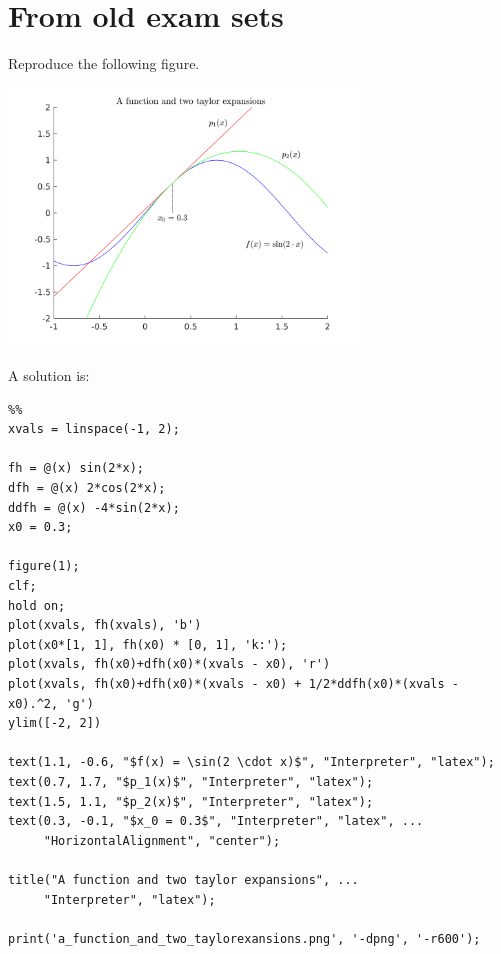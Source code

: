 \section{From old exam sets}



\begin{ex}
Reproduce the following figure.
\begin{center}
\includegraphics[width=0.7\textwidth]{pic/a_function_and_two_taylorexansions.png}
\end{center}
\begin{hint}
\end{hint}
\begin{sol}
A solution is:
\begin{lstlisting}
%%
xvals = linspace(-1, 2);

fh = @(x) sin(2*x);
dfh = @(x) 2*cos(2*x);
ddfh = @(x) -4*sin(2*x);
x0 = 0.3;

figure(1);
clf;
hold on;
plot(xvals, fh(xvals), 'b')
plot(x0*[1, 1], fh(x0) * [0, 1], 'k:');
plot(xvals, fh(x0)+dfh(x0)*(xvals - x0), 'r')
plot(xvals, fh(x0)+dfh(x0)*(xvals - x0) + 1/2*ddfh(x0)*(xvals - x0).^2, 'g')
ylim([-2, 2])

text(1.1, -0.6, "$f(x) = \sin(2 \cdot x)$", "Interpreter", "latex");
text(0.7, 1.7, "$p_1(x)$", "Interpreter", "latex");
text(1.5, 1.1, "$p_2(x)$", "Interpreter", "latex");
text(0.3, -0.1, "$x_0 = 0.3$", "Interpreter", "latex", ...
     "HorizontalAlignment", "center");
 
title("A function and two taylor expansions", ...
     "Interpreter", "latex");
 
print('a_function_and_two_taylorexansions.png', '-dpng', '-r600');
\end{lstlisting}
\end{sol}
\end{ex}


